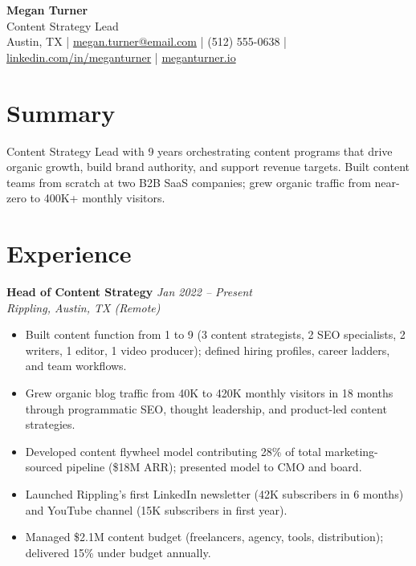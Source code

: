 \documentclass[11pt,a4paper]{article}
\begin{document}
\begin{center}
  {\LARGE \textbf{Megan Turner}}\\[3pt]
  {\large \textcolor{accent}{Content Strategy Lead}}\\[4pt]
  Austin, TX \quad|\quad
  \href{mailto:megan.turner@email.com}{megan.turner@email.com} \quad|\quad
  (512) 555-0638 \quad|\quad
  \href{https://linkedin.com/in/meganturner}{linkedin.com/in/meganturner} \quad|\quad
  \href{https://meganturner.io}{meganturner.io}
\end{center}

\section{Summary}
Content Strategy Lead with 9 years orchestrating content programs that drive organic growth, build brand authority, and support revenue targets. Built content teams from scratch at two B2B SaaS companies; grew organic traffic from near-zero to 400K+ monthly visitors.

\section{Experience}

\noindent\textbf{Head of Content Strategy} \hfill \textit{Jan 2022 -- Present}\\
\textit{Rippling, Austin, TX (Remote)}
\begin{itemize}
  \item Built content function from 1 to 9 (3 content strategists, 2 SEO specialists, 2 writers, 1 editor, 1 video producer); defined hiring profiles, career ladders, and team workflows.
  \item Grew organic blog traffic from 40K to 420K monthly visitors in 18 months through programmatic SEO, thought leadership, and product-led content strategies.
  \item Developed content flywheel model contributing 28\% of total marketing-sourced pipeline (\$18M ARR); presented model to CMO and board.
  \item Launched Rippling's first LinkedIn newsletter (42K subscribers in 6 months) and YouTube channel (15K subscribers in first year).
  \item Managed \$2.1M content budget (freelancers, agency, tools, distribution); delivered 15\% under budget annually.
\end{itemize}
\end{document}
